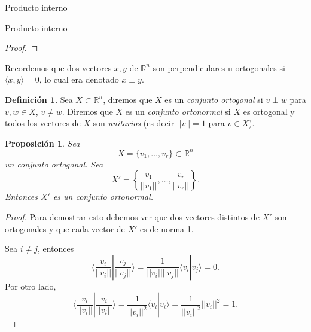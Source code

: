 \documentclass[a4paper,12pt,twoside,spanish,reqno]{amsbook}
\numberwithin{equation}{section}
\newtheorem{proposicion}[teorema]{Proposici\'on}
\theoremstyle{definition}
\newtheorem{definicion}[teorema]{Definici\'on}
\theoremstyle{remark}
\newcommand{\la}{\langle}
\newcommand{\ra}{\rangle}
\newcommand{\R}{\mathbb R}
\begin{document}
\begin{chapter}{Producto interno}
\begin{section}{Producto interno}
\begin{proof}
            
        \end{proof}
        
        \medskip
        
        Recordemos que dos vectores $x,y$  de $\R^n$ son perpendiculares u ortogonales si $\la x,y\ra =0$, lo cual era denotado $x \perp y$. 
        
        \begin{definicion} Sea $X \subset \R^n$, diremos que $X$ es un \emph{conjunto ortogonal} si $v\perp w$ para $v,w \in X$, $v\not= w$. Diremos que $X$ es un \emph{conjunto ortonormal} si $X$ es ortogonal y todos los vectores de $X$ son  \textit{unitarios} (es decir $||v|| =1$ para $v \in X$).
        \end{definicion}
    
        
        \begin{proposicion}\label{ortogonal->ortonormal}
            Sea  $$X = \{v_1,\ldots,v_r \} \subset \R^n$$ un conjunto ortogonal. Sea 
            \begin{equation*}
                X' =  \left\{\frac{v_1}{||v_1||},\ldots,\frac{v_r}{||v_r||} \right\}.
            \end{equation*}
            Entonces $X'$ es  un conjunto ortonormal. 
        \end{proposicion}
        \begin{proof}
            Para demostrar esto debemos ver que dos vectores distintos de $X'$ son ortogonales y que cada vector de $X'$ es de norma 1.
            
            Sea $i \ne j$, entonces
            \begin{equation*}
            \la \frac{v_i}{||v_i||} | \frac{v_j}{||v_j||}\ra = \frac{1}{||v_i||||v_j||} \la v_i | v_j\ra = 0.
            \end{equation*}
            Por otro lado,
            \begin{equation*}
            \la \frac{v_i}{||v_i||} | \frac{v_i}{||v_i||}\ra = \frac{1}{||v_i||^2} \la v_i | v_i\ra=  \frac{1}{||v_i||^2}||v_i||^2 =1.
            \end{equation*}
        \end{proof}	
            
            
            
        
        
        \medskip
        

\end{section}
\end{chapter}
\end{document}

